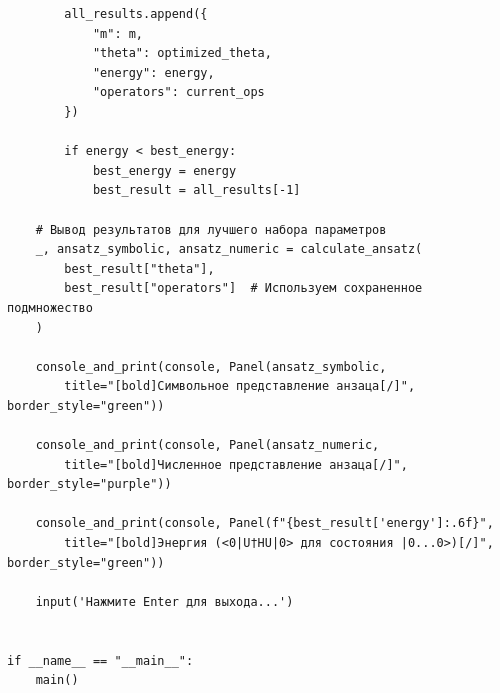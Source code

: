 \documentclass[a4paper]{report}
\begin{document}
\begin{lstlisting}
        all_results.append({
            "m": m,
            "theta": optimized_theta,
            "energy": energy,
            "operators": current_ops
        })

        if energy < best_energy:
            best_energy = energy
            best_result = all_results[-1]

    # Вывод результатов для лучшего набора параметров
    _, ansatz_symbolic, ansatz_numeric = calculate_ansatz(
        best_result["theta"],
        best_result["operators"]  # Используем сохраненное подмножество
    )

    console_and_print(console, Panel(ansatz_symbolic,
        title="[bold]Символьное представление анзаца[/]", border_style="green"))

    console_and_print(console, Panel(ansatz_numeric,
        title="[bold]Численное представление анзаца[/]", border_style="purple"))

    console_and_print(console, Panel(f"{best_result['energy']:.6f}",
        title="[bold]Энергия (<0|U†HU|0> для состояния |0...0>)[/]", border_style="green"))

    input('Нажмите Enter для выхода...')


if __name__ == "__main__":
    main()
\end{lstlisting}
\end{document}
